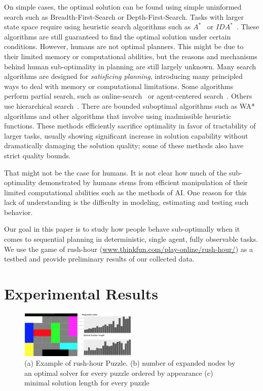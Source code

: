 \documentclass[10pt,letterpaper]{article}
\begin{document}
On simple cases, the optimal solution can be found using simple uninformed search such as Breadth-First-Search or Depth-First-Search. Tasks with larger state space require using heuristic search algorithms such as $A^*$~\cite{(Hart and Nillsen)} or $IDA^*$~\cite{(Korf)}. These algorithms  are still guaranteed to find the optimal solution under certain conditions.
However, humans are not optimal planners. This might be due to their limited memory or computational abilities, but the reasons and mechanisms behind human sub-optimality in planning are still largely unknown. Many search algorithms are designed for \emph{satisficing planning}, introducing many principled ways to deal with memory or computational limitations. Some algorithms perform partial search, such as online-search ~\cite{RTA*}or agent-centered search~\cite{Sven}. Others use hierarchical search~\cite{Dananau}. There are bounded suboptimal algorithms such as WA*~\cite{} algorithms and other algorithms that involve using inadmissible heuristic functions. These methods efficiently sacrifice optimality in favor of tractability of larger tasks, usually showing significant increase in solution capability without dramatically damaging the solution quality; some of these methods also have strict quality bounds. 

That might not be the case for humans.  It is not clear how much of the sub-optimality demonstrated by humans stems from efficient manipulation of their limited computational abilities such as the methods of AI.  One reason for this lack of understanding is the difficulty in modeling, estimating and testing such behavior. 

Our goal in this paper is to study how people behave sub-optimally when it comes to sequential planning in deterministic, single agent, fully observable tasks. 
We use the game of rush-hour (\url{www.thinkfun.com/play-online/rush-hour/}) as a testbed and provide preliminary results of our collected data.

\section{Experimental Results}


\begin{figure}[ht]
\begin{center}
\includegraphics[width=0.5\textwidth]{puzzle}
\end{center}
\caption{(a) Example of rush-hour Puzzle. (b) number of expanded nodes by an optimal solver for every puzzle ordered by appearance (c) minimal solution length for every puzzle} 
\label{fig:puzzle}
\end{figure}
\end{document}
